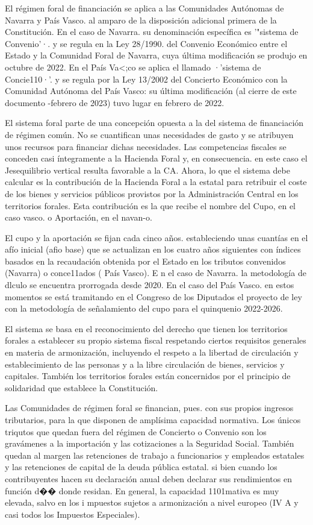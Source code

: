 \documentclass[10pt,a4paper]{article}
\begin{document}
El régimen foral de financiación se aplica a las Comunidades Autónomas de Navarra y País Vasco. al amparo de la disposición adicional primera de la Constitución. En el caso de Navarra. su denominación específica es '"sistema de Convenio'·. y se regula en la Ley 28/1990. del Convenio Económico entre el Estado y la Comunidad Foral de Navarra, cuya última modificación se produjo en octubre de 2022. En el País Va<;co se aplica el llamado ·'sistema de Concie110·'. y se regula por la Ley 13/2002 del Concierto Económico con la Comunidad Autónoma del País Vasco: su última modificación (al cierre de este documento -febrero de 2023) tuvo lugar en febrero de 2022.

El sistema foral parte de una concepción opuesta a la del sistema de financiación de régimen común. No se cuantifican unas necesidades de gasto y se atribuyen unos recursos para financiar dichas necesidades. Las competencias fiscales se conceden casi íntegramente a la Hacienda Foral y, en consecuencia. en este caso el Jesequilibrio vertical resulta favorable a la CA. Ahora, lo que el sistema debe calcular es la contribución de la Hacienda Foral a la estatal para retribuir el coste de los bienes y servicios públicos provistos por la Administración Central en los territorios forales. Esta contribución es la que recibe el nombre del Cupo, en el caso vasco. o Aportación, en el navan-o.

El cupo y la aportación se fijan cada cinco años. estableciendo unas cuantías en el afío inicial (afio base) que se actualizan en los cuatro años siguientes con índices basados en la recaudación obtenida por el Estado en los tributos convenidos (Navarra) o conce11ados ( País Vasco). E n el caso de Navarra. la metodología de dlculo se encuentra prorrogada desde 2020. En el caso del País Vasco. en estos momentos se está tramitando en el Congreso de los Diputados el proyecto de ley con la metodología de señalamiento del cupo para el quinquenio 2022-2026.

El sistema se basa en el reconocimiento del derecho que tienen los territorios forales a establecer su propio sistema fiscal respetando ciertos requisitos generales en materia de armonización, incluyendo el respeto a la libertad de circulación y establecimiento de las personas y a la libre circulación de bienes, servicios y capitales. También los territorios forales están concernidos por el principio de solidaridad que establece la Constitución.

Las Comunidades de régimen foral se financian, pues. con sus propios ingresos tributarios, para la que disponen de amplísima capacidad normativa. Los únicos triqutos que quedan fuera del régimen de Concierto o Convenio son los gravámenes a la importación y las cotizaciones a la Seguridad Social. También quedan al margen las retenciones de trabajo a funcionarios y empleados estatales y las retenciones de capital de la deuda pública estatal. si bien cuando los contribuyentes hacen su declaración anual deben declarar sus rendimientos en función d�� donde residan. En general, la capacidad 1101mativa es muy elevada, salvo en los i mpuestos sujetos a armonización a nivel europeo (IV A y casi todos los Impuestos Especiales).
\end{document}
